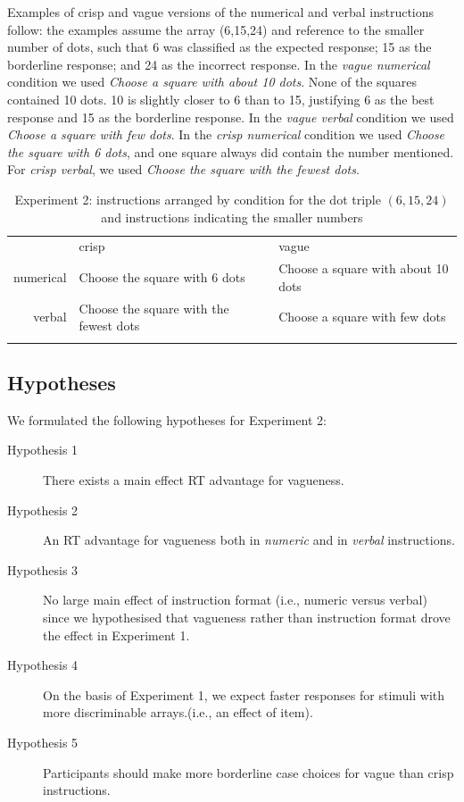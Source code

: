 Examples of crisp and vague versions of the numerical and verbal instructions follow: the examples assume the array (6,15,24) and reference to the smaller number of dots, such that 6 was classified as the expected response; 15 as the borderline response; and 24 as the incorrect response. In the {\em vague numerical} condition we used \emph{Choose a square with about 10 dots}. None of the squares contained 10 dots. 10 is slightly closer to 6 than to 15, justifying 6 as the best response and 15 as the borderline response. In the {\em vague verbal} condition we used \emph{Choose a square with few dots}. In the {\em crisp numerical} condition we used \emph{Choose the square with 6 dots}, and one square always did contain the number mentioned. For {\em crisp verbal}, we used \emph{Choose the square with the fewest dots}.

\begin{table}
\centering
\caption{Experiment 2: instructions arranged by condition for the dot triple $(6,15,24)$ and instructions indicating the smaller numbers}
\label{instructionse2}
\begin{tabular}{rll}
\hline\noalign{\smallskip}
&crisp&vague\\
\noalign{\smallskip}\hline\noalign{\smallskip}
numerical	&	Choose the square with 6 dots 			& 	Choose a square with about 10 dots	\\
verbal		&	Choose the square with the fewest dots	&	Choose a square with few dots		\\
\noalign{\smallskip}\hline
\end{tabular}
\end{table}

\subsection{Hypotheses} 

We formulated the following hypotheses for Experiment 2:

\begin{description}
	\item [Hypothesis 1] There exists a main effect RT advantage for vagueness.
	\item [Hypothesis 2] An RT advantage for vagueness both in \emph{numeric} and in \emph{verbal} instructions.
	\item [Hypothesis 3] No large main effect of instruction format (i.e., numeric versus verbal) since we hypothesised that vagueness rather than instruction format drove the effect in Experiment 1.
	\item [Hypothesis 4] On the basis of Experiment 1, we expect faster responses for stimuli with more discriminable arrays.(i.e., an effect of item).
	\item [Hypothesis 5] Participants should make more borderline case choices for vague than crisp instructions.
\end{description}

